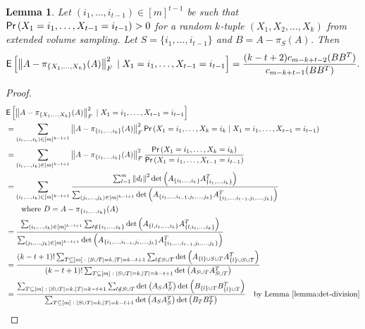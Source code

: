 \documentclass[11pt]{article}
\newtheorem{lemma}[theorem]{Lemma}
\def\suchthat{\;:\;}
\def\given{\;|\;}
\newcommand{\deter}[1]{\operatorname{det}\left(#1\right)}
\newcommand{\norm}[1]{\left\|#1\right\|}
\newcommand{\frob}[1]{\left\|#1\right\|_{F}}
\newcommand{\prob}[1]{{\sf Pr} \left(#1\right)}
\newcommand{\expec}[1]{{\sf E} \left[#1\right]}
\newcommand{\size}[1]{\left|#1\right|}
\begin{document}
\begin{lemma} \label{lemma:conditional}
Let $(i_{1}, \dotsc, i_{t-1}) \in [m]^{t-1}$ be such that $\prob{X_{1} = i_{1}, \dotsc, X_{t-1} = i_{t-1}} > 0$ for a random $k$-tuple $(X_{1}, X_{2}, \dotsc, X_{k})$ from extended volume sampling. Let $S = \{i_{1}, \dotsc, i_{t-1}\}$ and $B = A - \pi_{S}(A)$. Then
\[
\expec{\frob{A - \pi_{\{X_{1}, \dotsc, X_{k}\}}(A)}^{2} \given X_{1} = i_{1}, \dotsc, X_{t-1} = i_{t-1}} = \frac{(k-t+2) c_{m-k+t-2} (BB^{T})}{c_{m-k+t-1} (BB^{T})}.
\]
\end{lemma}
\begin{proof}
\begin{align*}
& \expec{\frob{A - \pi_{\{X_{1}, \dotsc, X_{k}\}}(A)}^{2} \given X_{1} = i_{1}, \dotsc, X_{t-1} = i_{t-1}} \\
& = \sum_{(i_{t}, \dotsc, i_{k}) \in [m]^{k-t+1}} \frob{A - \pi_{\{i_{1}, \dotsc, i_{k}\}}(A)}^{2} \prob{X_{1} = i_{1}, \dots, X_{k} = i_{k} \given X_{1} = i_{1}, \dotsc, X_{t-1} = i_{t-1}} \\
& = \sum_{(i_{t}, \dotsc, i_{k}) \in [m]^{k-t+1}} \frob{A - \pi_{\{i_{1}, \dotsc, i_{k}\}}(A)}^{2} \frac{\prob{X_{1} = i_{1}, \dotsc, X_{k} = i_{k}}}{\prob{X_{1} = i_{1}, \dotsc, X_{t-1} = i_{t-1}}} \\
& = \sum_{(i_{t}, \dotsc, i_{k}) \in [m]^{k-t+1}} \frac{\sum_{l=1}^{m} \norm{d_{l}}^{2} \deter{A_{\{i_{1}, \dotsc, i_{k}\}} A_{\{i_{1}, \dotsc, i_{k}\}}^{T}}}{\sum_{(j_{t}, \dotsc, j_{k}) \in [m]^{k-t+1}} \deter{A_{\{i_{1}, \dotsc, i_{t-1}, j_{t}, \dots, j_{k}\}} A_{\{i_{1}, \dotsc, i_{t-1}, j_{t}, \dots, j_{k}\}}^{T}}} \\
& \qquad \text{where $D = A - \pi_{\{i_{1}, \dotsc, i_{k}\}}(A)$} \\
& = \frac{\sum_{(i_{t}, \dotsc, i_{k}) \in [m]^{k-t+1}} \sum_{l \notin \{i_{1}, \dotsc, i_{k}\}} \deter{A_{\{l, i_{1}, \dotsc, i_{k}\}} A_{\{l, i_{1}, \dotsc, i_{k}\}}^{T}}}{\sum_{(j_{t}, \dotsc, j_{k}) \in [m]^{k-t+1}} \deter{A_{\{i_{1}, \dotsc, i_{t-1}, j_{t}, \dots, j_{k}\}} A_{\{i_{1}, \dotsc, i_{t-1}, j_{t}, \dots, j_{k}\}}^{T}}} \\
& = \frac{(k-t+1)! \sum_{T \subseteq [m] \suchthat \size{S \cup T}=k, \size{T}=k-t+1} \sum_{l \notin S \cup T} \deter{A_{\{l\} \cup S \cup T} A_{\{l\} \cup S \cup T}^{T}}}{(k-t+1)! \sum_{T \subseteq [m] \suchthat \size{S \cup T}=k, \size{T}=k-t+1} \deter{A_{S \cup T} A_{S \cup T}^{T}}} \\
& = \frac{\sum_{T \subseteq [m] \suchthat \size{S \cup T}=k, \size{T}=k-t+1} \sum_{l \notin S \cup T} \deter{A_{S} A_{S}^{T}} \deter{B_{\{l\} \cup T} B_{\{l\} \cup T}^{T}}}{\sum_{T \subseteq [m] \suchthat \size{S \cup T}=k, \size{T}=k-t+1} \deter{A_{S} A_{S}^{T}} \deter{B_{T} B_{T}^{T}}} \quad \text{by Lemma \ref{lemma:det-division}} \\

\end{align*}
\end{proof}
\end{document}
